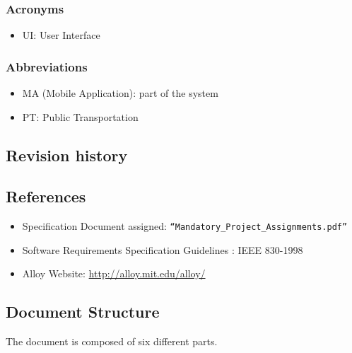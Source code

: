 \subsubsection{Acronyms}
\begin{itemize}
	\item UI: User Interface
\end{itemize}

\subsubsection{Abbreviations}
\begin{itemize}
	\item MA (Mobile Application): part of the system
	\item PT: Public Transportation
\end{itemize}

\subsection{Revision history}




\subsection{References}


\begin{itemize}
	\item Specification Document assigned: \texttt{“Mandatory\_Project\_Assignments.pdf”}
	\item Software Requirements Specification Guidelines : IEEE 830-1998
	\item Alloy Website: \url{http://alloy.mit.edu/alloy/}
\end{itemize}

\subsection{Document Structure}

The document is composed of six different parts.

